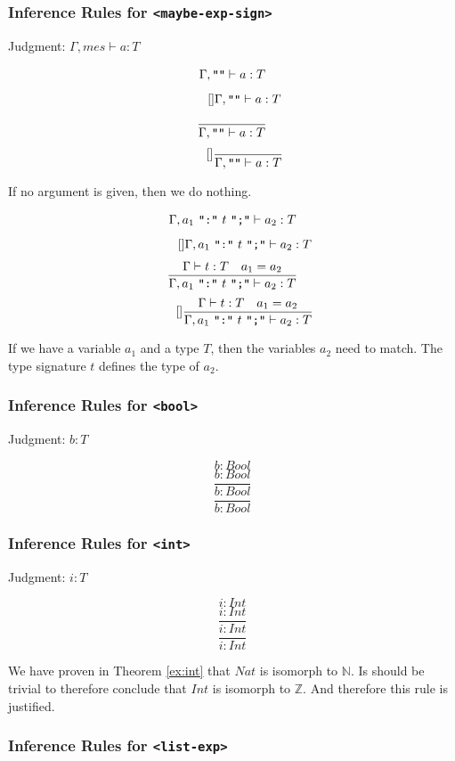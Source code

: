 \documentclass[]{scrbook}
\newcommand{\mf}[1]{\text{\texttt{#1}}}
\newcommand{\logicRule}[3]{
  \ifstrempty{#1}
  {
    \ifstrempty{#3}
    {
      \[#2\]
    }
    {
      \[\tag*{[#3]} #2\]
    }
  }
  {
    \ifstrempty{#3}
    {
      \[\dfrac{#1}{#2}\]
    }
    {
      \[\tag*{[#3]} \dfrac{#1}{#2}\]
    }
  }
  
}
\theoremstyle{definition}
\theoremstyle{definition}
\theoremstyle{definition}
\theoremstyle{remark}
\begin{document}
\subsubsection*{\texorpdfstring{Inference Rules for
\texttt{\textless{}maybe-exp-sign\textgreater{}}}{Inference Rules for \textless{}maybe-exp-sign\textgreater{}}}\label{inference-rules-for-maybe-exp-sign}

Judgment: \(\Gamma,mes\vdash a:T\)

\logicRule
{}
{\Gamma,\mf{""} \vdash a : T}
{} If no argument is given, then we do nothing.

\logicRule
{\Gamma\vdash t:T\quad
a_1 = a_2
}
{\Gamma,a_1 \ \mf{":"} \ t\ \mf{";"} \vdash a_2 : T}
{} If we have a variable \(a_1\) and a type \(T\), then the variables
\(a_2\) need to match. The type signature \(t\) defines the type of
\(a_2\).

\subsubsection*{\texorpdfstring{Inference Rules for
\texttt{\textless{}bool\textgreater{}}}{Inference Rules for \textless{}bool\textgreater{}}}\label{inference-rules-for-bool}

Judgment: \(b:T\)

\logicRule
{}
{b:\mathit{Bool}}
{}

\subsubsection*{\texorpdfstring{Inference Rules for
\texttt{\textless{}int\textgreater{}}}{Inference Rules for \textless{}int\textgreater{}}}\label{inference-rules-for-int}

Judgment: \(i:T\)

\logicRule
{}
{i:\mathit{Int}}
{} We have proven in Theorem \ref{ex:int} that \(\mathit{Nat}\) is
isomorph to \(\mathbb{N}\). Is should be trivial to therefore conclude
that \(\mathit{Int}\) is isomorph to \(\mathbb{Z}\). And therefore this
rule is justified.

\subsubsection*{\texorpdfstring{Inference Rules for
\texttt{\textless{}list-exp\textgreater{}}}{Inference Rules for \textless{}list-exp\textgreater{}}}\label{inference-rules-for-list-exp}
\end{document}

